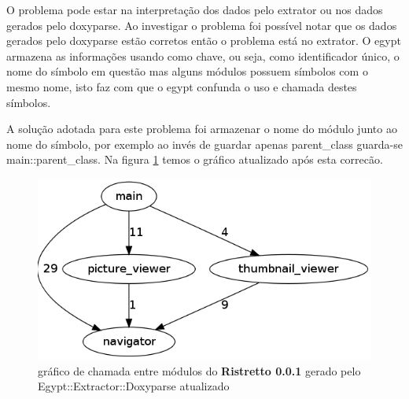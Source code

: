 O problema pode estar na interpretação dos dados pelo extrator ou nos dados
gerados pelo doxyparse. Ao investigar o problema foi possível notar que os
dados gerados pelo doxyparse estão corretos então o problema está no extrator. O
egypt armazena as informações usando como chave, ou seja, como identificador
único, o nome do símbolo em questão mas alguns módulos possuem símbolos com o
mesmo nome, isto faz com que o egypt confunda o uso e chamada destes símbolos.

A solução adotada para este problema foi armazenar o nome do módulo junto ao
nome do símbolo, por exemplo ao invés de guardar apenas parent\_class guarda-se
main::parent\_class. Na figura \ref{ristretto-0.0.1-doxyparse-2} temos o
gráfico atualizado após esta correcão.

\begin{figure}[h]
\center
\includegraphics[scale=0.3]{imagens/ristretto-0_0_1-doxyparse-2}
\caption{gráfico de chamada entre módulos do {\bf Ristretto 0.0.1} gerado pelo Egypt::Extractor::Doxyparse atualizado}
\label{ristretto-0.0.1-doxyparse-2}
\end{figure}

